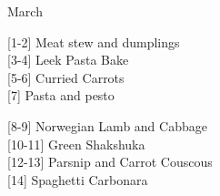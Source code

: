 		\begin{menu}{March}
    
    \begin{recipelist}
    
        {\scriptsize[1-2]} Meat stew and dumplings\\
        {\scriptsize[3-4]} Leek Pasta Bake\\
        {\scriptsize[5-6]} Curried Carrots\\
        {\scriptsize[7]} Pasta and pesto\\%
    \end{recipelist}%
    \begin{recipelist}
    
        {\scriptsize[8-9]} Norwegian Lamb and Cabbage\\
        {\scriptsize[10-11]} Green Shakshuka\\
        {\scriptsize[12-13]} Parsnip and Carrot Couscous\\
        {\scriptsize[14]} Spaghetti Carbonara\\%
    \end{recipelist}\par%
  

\end{menu}
